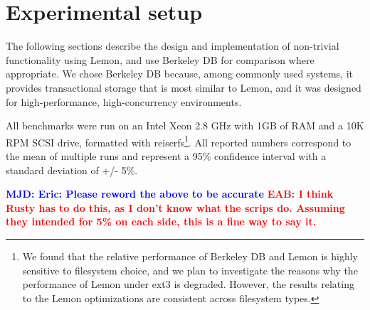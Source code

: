 \documentclass[letterpaper,twocolumn,english]{article}
\newcommand{\yad}{Lemon\xspace}
\newcommand{\eab}[1]{\textcolor{red}{\bf EAB: #1}}
\newcommand{\mjd}[1]{\textcolor{blue}{\bf MJD: #1}}
\begin{document}
%










\section{Experimental setup}
\label{sec:experimental_setup}

The following sections describe the design and implementation of
non-trivial functionality using \yad, and use Berkeley DB for
comparison where appropriate.  We chose Berkeley DB because, among
commonly used systems, it provides transactional storage that is most
similar to \yad, and it was
designed for high-performance, high-concurrency environments.

All benchmarks were run on an Intel Xeon 2.8 GHz with 1GB of RAM and a
10K RPM SCSI drive, formatted with reiserfs\footnote{We found that
the relative performance of Berkeley DB and \yad is highly sensitive
to filesystem choice, and we plan to investigate the reasons why the
performance of \yad under ext3 is degraded. However, the results
relating to the \yad optimizations are consistent across filesystem
types.}.
All reported numbers
correspond to the mean of multiple runs and represent a 95\%
confidence interval with a standard deviation of +/- 5\%.

\mjd{Eric: Please reword the above to be accurate}
\eab{I think Rusty has to do this, as I don't know what the scrips do.  Assuming they intended for 5\% on each side, this is a fine way to say it.}
\end{document}
